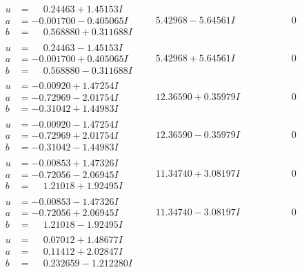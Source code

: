 \documentclass[1p]{elsarticle_modified}
\theoremstyle{definition}
\begin{document}
$$\begin{array}{c|c|c}
 \hline 
\begin{aligned}
u &= \phantom{-}0.24463 + 1.45153 I \\
a &= -0.001700 - 0.405065 I \\
b &= \phantom{-}0.568880 + 0.311688 I\end{aligned}
 & \phantom{-}5.42968 - 5.64561 I & \phantom{-0.000000 } 0 \\ \hline\begin{aligned}
u &= \phantom{-}0.24463 - 1.45153 I \\
a &= -0.001700 + 0.405065 I \\
b &= \phantom{-}0.568880 - 0.311688 I\end{aligned}
 & \phantom{-}5.42968 + 5.64561 I & \phantom{-0.000000 } 0 \\ \hline\begin{aligned}
u &= -0.00920 + 1.47254 I \\
a &= -0.72969 - 2.01754 I \\
b &= -0.31042 + 1.44983 I\end{aligned}
 & \phantom{-}12.36590 + 0.35979 I & \phantom{-0.000000 } 0 \\ \hline\begin{aligned}
u &= -0.00920 - 1.47254 I \\
a &= -0.72969 + 2.01754 I \\
b &= -0.31042 - 1.44983 I\end{aligned}
 & \phantom{-}12.36590 - 0.35979 I & \phantom{-0.000000 } 0 \\ \hline\begin{aligned}
u &= -0.00853 + 1.47326 I \\
a &= -0.72056 - 2.06945 I \\
b &= \phantom{-}1.21018 + 1.92495 I\end{aligned}
 & \phantom{-}11.34740 + 3.08197 I & \phantom{-0.000000 } 0 \\ \hline\begin{aligned}
u &= -0.00853 - 1.47326 I \\
a &= -0.72056 + 2.06945 I \\
b &= \phantom{-}1.21018 - 1.92495 I\end{aligned}
 & \phantom{-}11.34740 - 3.08197 I & \phantom{-0.000000 } 0 \\ \hline\begin{aligned}
u &= \phantom{-}0.07012 + 1.48677 I \\
a &= \phantom{-}0.11412 + 2.02847 I \\
b &= \phantom{-}0.232659 - 1.212280 I\end{aligned}

\end{array}$$
\end{document}
